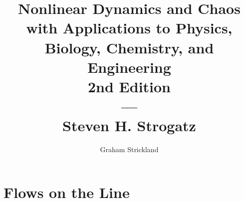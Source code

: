 \documentclass{article}
\title{
  Nonlinear Dynamics and Chaos with Applications to Physics, Biology, Chemistry,
  and Engineering\\2nd Edition\\---\\Steven H. Strogatz
}
\author{Graham Strickland}
\numberwithin{figure}{section}
\numberwithin{equation}{section}
\begin{document}
\maketitle

\setcounter{section}{1}
\section{Flows on the Line}

\end{document}
